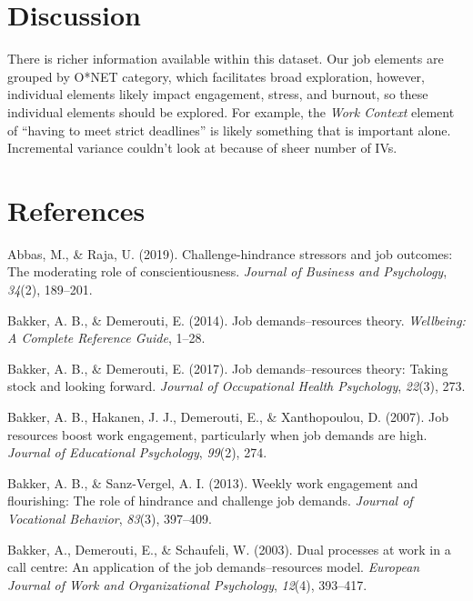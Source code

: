 \documentclass[
  english,
  man]{apa6}
\begin{document}
\hypertarget{discussion-1}{%
\section{Discussion}\label{discussion-1}}

There is richer information available within this dataset. Our job elements are grouped by O*NET category, which facilitates broad exploration, however, individual elements likely impact engagement, stress, and burnout, so these individual elements should be explored. For example, the \emph{Work Context} element of \enquote{having to meet strict deadlines} is likely something that is important alone. Incremental variance couldn't look at because of sheer number of IVs.

\newpage

\hypertarget{references}{%
\section{References}\label{references}}

\begingroup
\setlength{\parindent}{-0.5in}
\setlength{\leftskip}{0.5in}

\hypertarget{refs}{}
\leavevmode\hypertarget{ref-abbas2019challenge}{}%
Abbas, M., \& Raja, U. (2019). Challenge-hindrance stressors and job outcomes: The moderating role of conscientiousness. \emph{Journal of Business and Psychology}, \emph{34}(2), 189--201.

\leavevmode\hypertarget{ref-bakker2014job}{}%
Bakker, A. B., \& Demerouti, E. (2014). Job demands--resources theory. \emph{Wellbeing: A Complete Reference Guide}, 1--28.

\leavevmode\hypertarget{ref-bakker2017job}{}%
Bakker, A. B., \& Demerouti, E. (2017). Job demands--resources theory: Taking stock and looking forward. \emph{Journal of Occupational Health Psychology}, \emph{22}(3), 273.

\leavevmode\hypertarget{ref-bakker2007job}{}%
Bakker, A. B., Hakanen, J. J., Demerouti, E., \& Xanthopoulou, D. (2007). Job resources boost work engagement, particularly when job demands are high. \emph{Journal of Educational Psychology}, \emph{99}(2), 274.

\leavevmode\hypertarget{ref-bakker2013weekly}{}%
Bakker, A. B., \& Sanz-Vergel, A. I. (2013). Weekly work engagement and flourishing: The role of hindrance and challenge job demands. \emph{Journal of Vocational Behavior}, \emph{83}(3), 397--409.

\leavevmode\hypertarget{ref-bakker2003dual}{}%
Bakker, A., Demerouti, E., \& Schaufeli, W. (2003). Dual processes at work in a call centre: An application of the job demands--resources model. \emph{European Journal of Work and Organizational Psychology}, \emph{12}(4), 393--417.
\end{document}

